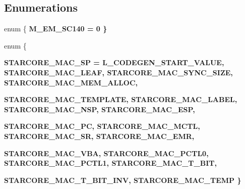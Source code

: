 \subsection*{Enumerations}
\begin{CompactItemize}
\item 
enum \{ \bf{M\_\-EM\_\-SC140} =  0
 \}
\item 
enum \{ \par
\bf{STARCORE\_\-MAC\_\-SP} =  L\_\-CODEGEN\_\-START\_\-VALUE, 
\bf{STARCORE\_\-MAC\_\-LEAF}, 
\bf{STARCORE\_\-MAC\_\-SYNC\_\-SIZE}, 
\bf{STARCORE\_\-MAC\_\-MEM\_\-ALLOC}, 
\par
\bf{STARCORE\_\-MAC\_\-TEMPLATE}, 
\bf{STARCORE\_\-MAC\_\-LABEL}, 
\bf{STARCORE\_\-MAC\_\-NSP}, 
\bf{STARCORE\_\-MAC\_\-ESP}, 
\par
\bf{STARCORE\_\-MAC\_\-PC}, 
\bf{STARCORE\_\-MAC\_\-MCTL}, 
\bf{STARCORE\_\-MAC\_\-SR}, 
\bf{STARCORE\_\-MAC\_\-EMR}, 
\par
\bf{STARCORE\_\-MAC\_\-VBA}, 
\bf{STARCORE\_\-MAC\_\-PCTL0}, 
\bf{STARCORE\_\-MAC\_\-PCTL1}, 
\bf{STARCORE\_\-MAC\_\-T\_\-BIT}, 
\par
\bf{STARCORE\_\-MAC\_\-T\_\-BIT\_\-INV}, 
\bf{STARCORE\_\-MAC\_\-TEMP}
 \}
\end{CompactItemize}
